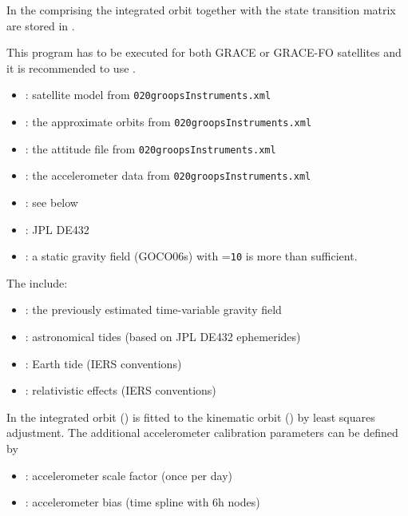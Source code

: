 In  the 
comprising the integrated orbit together with the state transition matrix are stored in
.

This program has to be executed for both GRACE or GRACE-FO satellites and it is recommended
to use .
\begin{itemize}
    \item {}: satellite model from \verb|020groopsInstruments.xml|
    \item {}: the approximate orbits from \verb|020groopsInstruments.xml|
    \item {}: the attitude file from \verb|020groopsInstruments.xml|
    \item {}: the accelerometer data from
    \verb|020groopsInstruments.xml|
    \item {}: see below
    \item {}: JPL DE432
    \item {}: a static gravity field (GOCO06s) with =\verb|10| is more than sufficient.
\end{itemize}

The  include:
\begin{itemize}
  \item {}:
        the previously estimated time-variable gravity field
  \item {}: astronomical tides (based on JPL DE432 ephemerides)
  \item {}: Earth tide (IERS conventions)
  \item {}:
        relativistic effects (IERS conventions)
\end{itemize}

In  the integrated orbit
() is fitted to the kinematic orbit
() by least squares adjustment. The additional accelerometer
calibration parameters can be defined by
\begin{itemize}
  \item {}: accelerometer scale factor (once per day)
  \item {}: accelerometer bias (time spline with 6h nodes)
\end{itemize}

